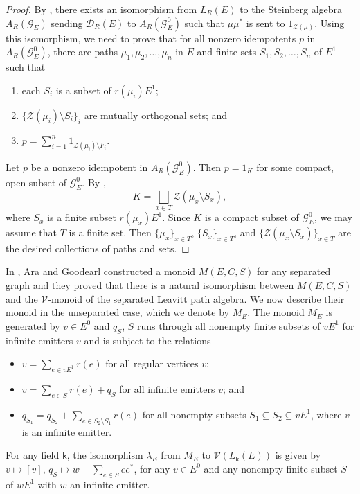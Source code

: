 \documentclass[11pt, letterpaper,final]{amsart}
\newcommand{\V}{\mathcal{V}}
\newcommand{\D}{\mathcal{D}}
\newcommand{\Z}{\mathcal{Z}}
\theoremstyle{definition}
\theoremstyle{remark}
\begin{document}
\begin{proof}
By \cite[Example~3.2]{ClarkSims}, there exists an isomorphism from $L_R(E)$ to the Steinberg algebra $A_R(\mathcal{G}_E)$ sending $\D_R(E)$ to $A_R( \mathcal{G}_E^0)$ such that $\mu \mu^*$ is sent to $1_{\Z(\mu)}$.  Using this isomorphism, we need to prove that for all nonzero idempotents $p$ in $A_R( \mathcal{G}_E^0)$, there are paths $\mu_1, \mu_2, \ldots, \mu_n$ in $E$ and finite sets $S_1, S_2, \ldots, S_n$ of $E^1$ such that 
\begin{enumerate}
    \item each $S_i$ is a subset of $r(\mu_i) E^1$;

    \item $\{ \Z (\mu_i) \setminus S_i \}_i$ are mutually orthogonal sets; and 

    \item  $p =\sum_{ i =1}^n 1_{\Z(\mu_i)\setminus F_i}$.
\end{enumerate}
Let $p$ be a nonzero idempotent in $A_R( \mathcal{G}_E^0)$.  Then $p = 1_K$ for some compact, open subset of $\mathcal{G}_E^0$.  By \cite[Proof of Lemma~2.1]{BCW2017}, 
$$K= \bigsqcup_{ x \in T } \Z( \mu_x \setminus S_x ),$$
where $S_x$ is a finite subset $r(\mu_x) E^1$.  Since $K$ is a compact subset of $\mathcal{G}_E^0$, we may assume that $T$ is a finite set.  Then $\{ \mu_x \}_{x \in T}$, $\{ S_x \}_{ x \in T }$, and $\{ \Z( \mu_x \setminus S_x) \}_{x \in T}$ are the desired collections of paths and sets.
\end{proof}


In \cite{AraGoodearl2012}, Ara and Goodearl constructed a monoid $M(E, C, S)$ for any separated graph and they proved that there is a natural isomorphism between $M(E, C, S)$ and the $\V$-monoid of the separated Leavitt path algebra.  We now describe their monoid in the unseparated case, which we denote by $M_E$.  The monoid $M_E$ is generated by $v \in E^0$ and $q_S$, $S$ runs through all nonempty finite subsets of $v E^1$ for infinite emitters $v$ and is subject to the relations
\begin{itemize}
    \item[(i)] $v = \sum_{ e \in v E^1 } r(e)$ for all regular vertices $v$; 

    \item[(ii)] $v = \sum_{ e \in S } r(e) + q_S$ for all infinite emitters $v$; and 

    \item[(iii)] $q_{S_1} = q_{S_2}+ \sum_{e \in S_2 \setminus S_1 } r(e)$ for all nonempty subsets $S_1 \subseteq S_2 \subseteq vE^1$, where $v$ is an infinite emitter.  
\end{itemize}
For any field $\mathsf{k}$, the isomorphism $\lambda_E$ from $M_E$ to $\V(L_\mathsf{k}(E))$ is given by $v \mapsto [v]$, $q_S \mapsto w - \sum_{ e \in S } ee^*$, for any $v \in E^0$ and any nonempty finite subset $S$ of $wE^1$ with $w$ an infinite emitter.  
\end{document}
